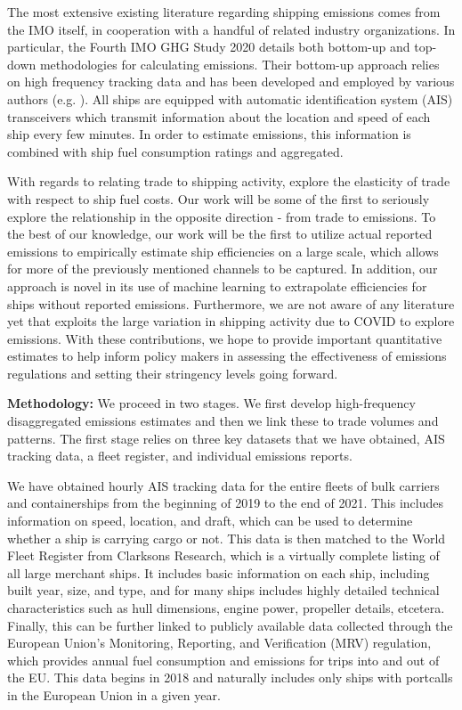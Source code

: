 \documentclass[hidelinks, 12pt,letterpaper]{article}
\begin{document}
The most extensive existing literature regarding shipping emissions comes from the IMO itself, in cooperation with a handful of related industry organizations. In particular, the Fourth IMO GHG Study 2020 \citep{faber2020fourth} details both bottom-up and top-down methodologies for calculating emissions. Their bottom-up approach relies on high frequency tracking data and has been developed and employed by various authors (e.g. \citet{olmer2017greenhouse, johansson2017global, jalkanen2009modelling, van2018spatially}). All ships are equipped with automatic identification system (AIS) transceivers which transmit information about the location and speed of each ship every few minutes. In order to estimate emissions, this information is combined with ship fuel consumption ratings and aggregated.

With regards to relating trade to shipping activity, \citet{brancaccio2018impact} explore the elasticity of trade with respect to ship fuel costs. Our work will be some of the first to seriously explore the relationship in the opposite direction - from trade to emissions. To the best of our knowledge, our work will be the first to utilize actual reported emissions to empirically estimate ship efficiencies on a large scale, which allows for more of the previously mentioned channels to be captured. In addition, our approach is novel in its use of machine learning to extrapolate efficiencies for ships without reported emissions. Furthermore, we are not aware of any literature yet that exploits the large variation in shipping activity due to COVID to explore emissions. With these contributions, we hope to provide important quantitative estimates to help inform policy makers in assessing the effectiveness of emissions regulations and setting their stringency levels going forward.


\smallskip 

\noindent \textbf{Methodology:} We proceed in two stages. We first develop high-frequency disaggregated emissions estimates and then we link these to trade volumes and patterns. The first stage relies on three key datasets that we have obtained, AIS tracking data, a fleet register, and individual emissions reports.

We have obtained hourly AIS tracking data for the entire fleets of bulk carriers and containerships from the beginning of 2019 to the end of 2021. This includes information on speed, location, and draft, which can be used to determine whether a ship is carrying cargo or not. This data is then matched to the World Fleet Register from Clarksons Research, which is a virtually complete listing of all large merchant ships. It includes basic  information on each ship, including built year, size, and type, and for many ships includes highly detailed technical characteristics such as hull dimensions, engine power, propeller details, etcetera. Finally, this can be further linked to publicly available data collected through the European Union's Monitoring, Reporting, and Verification (MRV) regulation, which provides annual fuel consumption and emissions for trips into and out of the EU. This data begins in 2018 and naturally includes only ships with portcalls in the European Union in a given year.
\end{document}
